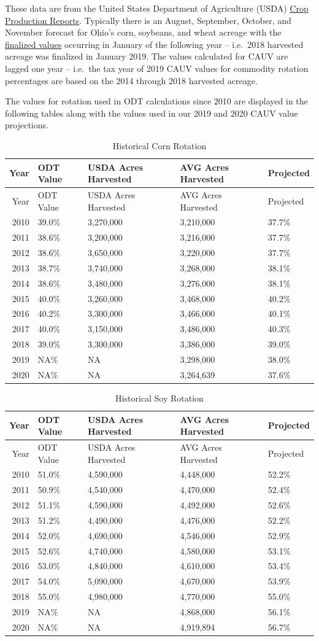 \documentclass[]{article}
\begin{document}
These data are from the United States Department of Agriculture (USDA)
\href{https://usda.mannlib.cornell.edu/MannUsda/viewDocumentInfo.do?documentID=1046}{Crop
Production Reports}. Typically there is an August, September, October,
and November forecast for Ohio's corn, soybeans, and wheat acreage with
the
\href{https://usda.mannlib.cornell.edu/MannUsda/viewDocumentInfo.do?documentID=1047}{finalized
values} occurring in January of the following year -- i.e.~2018
harvested acreage was finalized in January 2019. The values calculated
for CAUV are lagged one year -- i.e.~the tax year of 2019 CAUV values
for commodity rotation percentages are based on the 2014 through 2018
harvested acreage.

The values for rotation used in ODT calculations since 2010 are
displayed in the following tables along with the values used in our 2019
and 2020 CAUV value projections.

\begin{longtable}[]{@{}rllll@{}}
\caption{Historical Corn Rotation}\tabularnewline
\toprule
Year & ODT Value & USDA Acres Harvested & AVG Acres Harvested &
Projected\tabularnewline
\midrule
\endfirsthead
\toprule
Year & ODT Value & USDA Acres Harvested & AVG Acres Harvested &
Projected\tabularnewline
\midrule
\endhead
2010 & 39.0\% & 3,270,000 & 3,210,000 & 37.7\%\tabularnewline
2011 & 38.6\% & 3,200,000 & 3,216,000 & 37.7\%\tabularnewline
2012 & 38.6\% & 3,650,000 & 3,220,000 & 37.7\%\tabularnewline
2013 & 38.7\% & 3,740,000 & 3,268,000 & 38.1\%\tabularnewline
2014 & 38.6\% & 3,480,000 & 3,276,000 & 38.1\%\tabularnewline
2015 & 40.0\% & 3,260,000 & 3,468,000 & 40.2\%\tabularnewline
2016 & 40.2\% & 3,300,000 & 3,466,000 & 40.1\%\tabularnewline
2017 & 40.0\% & 3,150,000 & 3,486,000 & 40.3\%\tabularnewline
2018 & 39.0\% & 3,300,000 & 3,386,000 & 39.0\%\tabularnewline
2019 & NA\% & NA & 3,298,000 & 38.0\%\tabularnewline
2020 & NA\% & NA & 3,264,639 & 37.6\%\tabularnewline
\bottomrule
\end{longtable}

\begin{longtable}[]{@{}rllll@{}}
\caption{Historical Soy Rotation}\tabularnewline
\toprule
Year & ODT Value & USDA Acres Harvested & AVG Acres Harvested &
Projected\tabularnewline
\midrule
\endfirsthead
\toprule
Year & ODT Value & USDA Acres Harvested & AVG Acres Harvested &
Projected\tabularnewline
\midrule
\endhead
2010 & 51.0\% & 4,590,000 & 4,448,000 & 52.2\%\tabularnewline
2011 & 50.9\% & 4,540,000 & 4,470,000 & 52.4\%\tabularnewline
2012 & 51.1\% & 4,590,000 & 4,492,000 & 52.6\%\tabularnewline
2013 & 51.2\% & 4,490,000 & 4,476,000 & 52.2\%\tabularnewline
2014 & 52.0\% & 4,690,000 & 4,546,000 & 52.9\%\tabularnewline
2015 & 52.6\% & 4,740,000 & 4,580,000 & 53.1\%\tabularnewline
2016 & 53.0\% & 4,840,000 & 4,610,000 & 53.4\%\tabularnewline
2017 & 54.0\% & 5,090,000 & 4,670,000 & 53.9\%\tabularnewline
2018 & 55.0\% & 4,980,000 & 4,770,000 & 55.0\%\tabularnewline
2019 & NA\% & NA & 4,868,000 & 56.1\%\tabularnewline
2020 & NA\% & NA & 4,919,894 & 56.7\%\tabularnewline
\bottomrule
\end{longtable}
\end{document}

